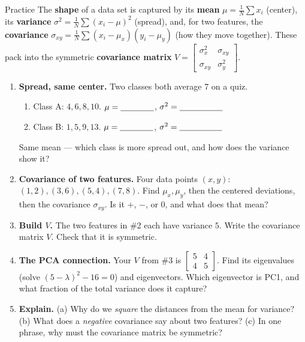 \documentclass[10pt]{article}
\begin{document}
\namedateperiod

\vspace{0.12in}

\begin{notesbox}{Practice}
The \textbf{shape} of a data set is captured by its \textbf{mean} $\mu=\frac1N\sum x_i$ (center), its
\textbf{variance} $\sigma^2=\frac1N\sum(x_i-\mu)^2$ (spread), and, for two features, the \textbf{covariance}
$\sigma_{xy}=\frac1N\sum(x_i-\mu_x)(y_i-\mu_y)$ (how they move together). These pack into the symmetric
\textbf{covariance matrix} $V=\left[\begin{smallmatrix}\sigma_x^2 & \sigma_{xy}\\ \sigma_{xy} & \sigma_y^2\end{smallmatrix}\right]$.

\begin{enumerate}[leftmargin=1.9em, itemsep=11pt]
  \item \textbf{Spread, same center.} Two classes both average $7$ on a quiz.
    \begin{enumerate}[label=(\alph*), leftmargin=1.8em, itemsep=4pt]
      \item Class A: $4,6,8,10$. \hfill $\mu=\underline{\hspace{1.4cm}}$, \; $\sigma^2=\underline{\hspace{1.8cm}}$
      \item Class B: $1,5,9,13$. \hfill $\mu=\underline{\hspace{1.4cm}}$, \; $\sigma^2=\underline{\hspace{1.8cm}}$
    \end{enumerate}
    Same mean --- which class is more spread out, and how does the variance show it? \writeline
  \item \textbf{Covariance of two features.} Four data points $(x,y)$: $(1,2),(3,6),(5,4),(7,8)$.
        Find $\mu_x,\mu_y$, then the centered deviations, then the covariance $\sigma_{xy}$. Is it $+$, $-$, or $0$,
        and what does that mean? 
  \item \textbf{Build $V$.} The two features in \#2 each have variance $5$. Write the covariance matrix $V$.
        Check that it is symmetric. 
  \item \textbf{The PCA connection.} Your $V$ from \#3 is $\left[\begin{smallmatrix}5&4\\4&5\end{smallmatrix}\right]$.
        Find its eigenvalues (solve $(5-\lambda)^2-16=0$) and eigenvectors. Which eigenvector is PC1, and what
        fraction of the total variance does it capture? 
  \item \textbf{Explain.} (a) Why do we \emph{square} the distances from the mean for variance? (b) What does a
        \emph{negative} covariance say about two features? (c) In one phrase, why must the covariance matrix be
        symmetric? 
\end{enumerate}
\end{notesbox}
\end{document}
